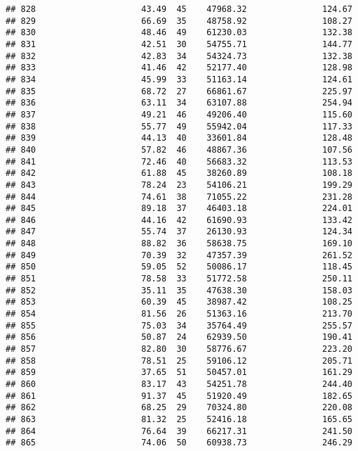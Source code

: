 \documentclass[
]{article}
\begin{document}
\begin{verbatim}
## 828                     43.49  45    47968.32               124.67
## 829                     66.69  35    48758.92               108.27
## 830                     48.46  49    61230.03               132.38
## 831                     42.51  30    54755.71               144.77
## 832                     42.83  34    54324.73               132.38
## 833                     41.46  42    52177.40               128.98
## 834                     45.99  33    51163.14               124.61
## 835                     68.72  27    66861.67               225.97
## 836                     63.11  34    63107.88               254.94
## 837                     49.21  46    49206.40               115.60
## 838                     55.77  49    55942.04               117.33
## 839                     44.13  40    33601.84               128.48
## 840                     57.82  46    48867.36               107.56
## 841                     72.46  40    56683.32               113.53
## 842                     61.88  45    38260.89               108.18
## 843                     78.24  23    54106.21               199.29
## 844                     74.61  38    71055.22               231.28
## 845                     89.18  37    46403.18               224.01
## 846                     44.16  42    61690.93               133.42
## 847                     55.74  37    26130.93               124.34
## 848                     88.82  36    58638.75               169.10
## 849                     70.39  32    47357.39               261.52
## 850                     59.05  52    50086.17               118.45
## 851                     78.58  33    51772.58               250.11
## 852                     35.11  35    47638.30               158.03
## 853                     60.39  45    38987.42               108.25
## 854                     81.56  26    51363.16               213.70
## 855                     75.03  34    35764.49               255.57
## 856                     50.87  24    62939.50               190.41
## 857                     82.80  30    58776.67               223.20
## 858                     78.51  25    59106.12               205.71
## 859                     37.65  51    50457.01               161.29
## 860                     83.17  43    54251.78               244.40
## 861                     91.37  45    51920.49               182.65
## 862                     68.25  29    70324.80               220.08
## 863                     81.32  25    52416.18               165.65
## 864                     76.64  39    66217.31               241.50
## 865                     74.06  50    60938.73               246.29

\end{verbatim}
\end{document}
